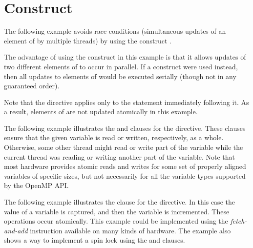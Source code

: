 \section{ Construct}
\label{sec:atomic}

The following example avoids race conditions (simultaneous updates of an element 
of  by multiple threads) by using the  construct .

The advantage of using the  construct in this example is that it 
allows updates of two different elements of  to occur in parallel. If 
a  construct were used instead, then all updates to elements of 
 would be executed serially (though not in any guaranteed order).

Note that the  directive applies only to the statement immediately 
following it. As a result, elements of  are not updated atomically in 
this example.



The following example illustrates the  and   clauses 
for the  directive. These clauses ensure that the given variable 
is read or written, respectively, as a whole. Otherwise, some other thread might 
read or write part of the variable while the current thread was reading or writing 
another part of the variable. Note that most hardware provides atomic reads and 
writes for some set of properly aligned variables of specific sizes, but not necessarily 
for all the variable types supported by the OpenMP API.



The following example illustrates the  clause for the  
directive. In this case the value of a variable is captured, and then the variable 
is incremented. These operations occur atomically. This example could 
be implemented using the \emph{fetch-and-add} instruction available on many kinds of hardware.
The example also shows a way to implement a spin lock using the  
 and  clauses.




